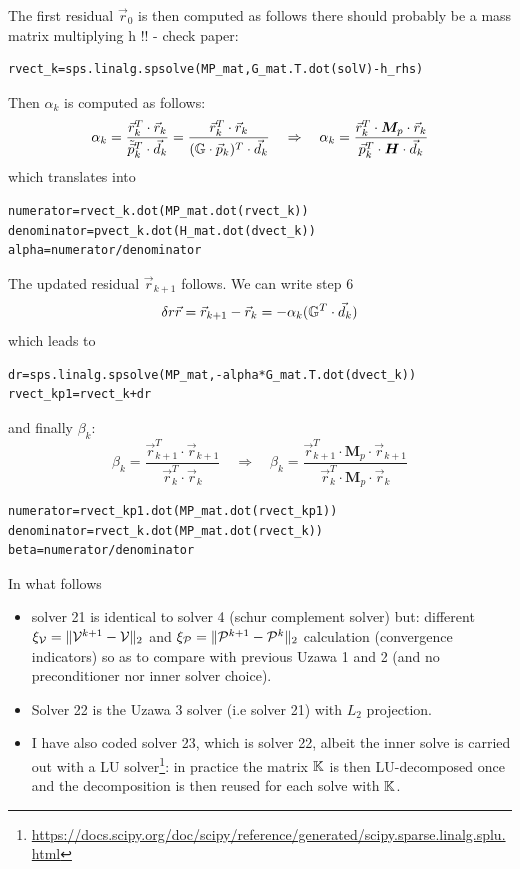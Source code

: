 The first residual $\vec{r}_0$ is then computed as follows {\color{red} there should probably be a mass matrix multiplying h !! - check paper}:
\begin{lstlisting}
rvect_k=sps.linalg.spsolve(MP_mat,G_mat.T.dot(solV)-h_rhs) 
\end{lstlisting}
Then $\alpha_k$ is computed as follows:
\[
\alpha_k
= \frac{ \vec{r}_k^T \cdot  \vec{r}_k } { \tilde{\vec{p}}_k^T \cdot \vec{d}_k }
= \frac{ \vec{r}_k^T \cdot  \vec{r}_k } {({\mathbb{G}} \cdot  \vec{p}_k)^T \cdot \vec{d}_k }
\quad
\Rightarrow
\quad
\alpha_k
= \frac{ \vec{r}_k^T \cdot {\bm M}_p \cdot \vec{r}_k } {\vec{p}_k^T \cdot {\bm H} \cdot \vec{d}_k }
\]
which translates into
\begin{lstlisting}
numerator=rvect_k.dot(MP_mat.dot(rvect_k))     
denominator=pvect_k.dot(H_mat.dot(dvect_k))   
alpha=numerator/denominator                  
\end{lstlisting}
The updated residual $\vec{r}_{k+1}$ follows. 
We can write step 6 
\[
\delta r\vec{r} = \vec{r}_{k+1} - \vec{r}_k = - \alpha_k ({\mathbb{G}}^T \cdot \vec{d}_k ) 
\]
which leads to
\begin{lstlisting}
dr=sps.linalg.spsolve(MP_mat,-alpha*G_mat.T.dot(dvect_k)) 
rvect_kp1=rvect_k+dr     
\end{lstlisting}
and finally $\beta_k$:
\[
\beta_k= \frac{ \vec{r}_{k+1}^T \cdot \vec{r}_{k+1} } { \vec{r}_k^T \cdot \vec{r}_k }
\quad
\Rightarrow
\quad
\beta_k= \frac{ \vec{r}_{k+1}^T \cdot {\bm M}_p \cdot \vec{r}_{k+1} }
{ \vec{r}_k^T \cdot {\bm M}_p \cdot \vec{r}_k }
\]
\begin{lstlisting}
numerator=rvect_kp1.dot(MP_mat.dot(rvect_kp1)) 
denominator=rvect_k.dot(MP_mat.dot(rvect_k))  
beta=numerator/denominator                   
\end{lstlisting}

In what follows 
\begin{itemize}
\item
solver 21 is identical to solver 4 (schur complement solver) but: 
different $\xi_{\cal V}=\|{\cal V}^{k+1}-{\cal V}\|_2$ and 
$\xi_{\cal P}=\|{\cal P}^{k+1}-{\cal P}^k\|_2$ calculation (convergence indicators) so as to 
compare with previous Uzawa 1 and 2 (and no preconditioner nor inner solver choice). 

\item
Solver 22 is the Uzawa 3 solver (i.e solver 21) with $L_2$ projection.

\item
I have also coded solver 23, which is solver 22, albeit the inner solve 
is carried out with a LU solver\footnote{\url{https://docs.scipy.org/doc/scipy/reference/generated/scipy.sparse.linalg.splu.html}}: 
in practice the matrix ${\mathbb{K}}$ is then LU-decomposed once and the decomposition 
is then reused for each solve with ${\mathbb{K}}$. 

\end{itemize}

